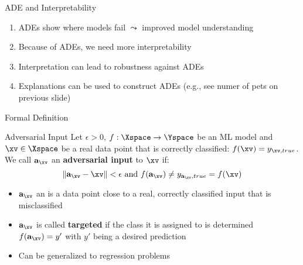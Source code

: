 \documentclass[11pt,compress,t,notes=noshow, aspectratio=169, xcolor=table]{beamer}
\begin{document}
\begin{vbframe}[c]{ADE and Interpretability}

\begin{enumerate}
    \item ADEs show where models fail $\leadsto$ improved model understanding
    \item Because of ADEs, we need more interpretability
    \item Interpretation can lead to robustness against ADEs
    \medskip
    \item Explanations can be used to construct ADEs (e.g., see numer of pets on previous slide)
\end{enumerate}

\end{vbframe}

\begin{vbframe}[c]{Formal Definition}
\begin{block}{Adversarial Input}
Let $\epsilon>0$, $f:\Xspace \rightarrow \Yspace$ be an ML model and $\xv \in \Xspace$ be a real data point that is correctly classified: $f(\xv)=y_{\xv,true}$. \\\medskip
 We call $\mathbf{a}_{\xv}$ an \textbf{adversarial input} to $\xv$ if:
\begin{equation*}
    \| \mathbf{a}_{\xv}- \xv\|<\epsilon\text{ and } f(\mathbf{a}_{\xv})\neq y_{\mathbf{a}_{\xv},true}=f(\xv)
\end{equation*}
\end{block}
\begin{itemize}
    \item $\mathbf{a}_{\xv}$ an is a data point close to a real, correctly classified input that is misclassified
    \item $\mathbf{a}_{\xv}$ is called \textbf{targeted} if the class it is assigned to is determined\\
    $f(\mathbf{a}_{\xv})=y'$ with $y'$ being a desired prediction
    \item Can be generalized to regression problems
\end{itemize}
\end{vbframe}
\end{document}
